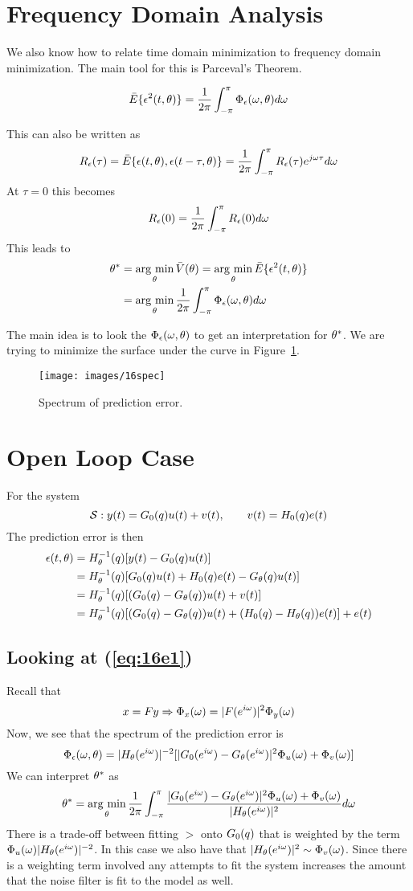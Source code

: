 \section{Frequency Domain Analysis}
We also know how to relate time domain minimization to frequency domain minimization.
The main tool for this is Parceval's Theorem.
\begin{theorem}
$$\bar{E}\{\epsilon^2(t,\theta)\} = \frac{1}{2\pi}\int_{-\pi}^\pi \Phi_\epsilon(\omega,\theta)d\omega$$
\end{theorem}
This can also be written as
$$R_\epsilon(\tau) = \bar{E}\{\epsilon(t,\theta),\epsilon(t-\tau,\theta)\} = \frac{1}{2\pi}\int_{-\pi}^\pi R_\epsilon(\tau)e^{j\omega\tau}d\omega$$
At $\tau=0$ this becomes
$$R_\epsilon(0) = \frac{1}{2\pi}\int_{-\pi}^\pi R_\epsilon(0)d\omega$$
This leads to
\begin{align*}
\theta^\ast &= \mathop{\arg\,\min}\limits_\theta\bar{V}(\theta) = \mathop{\arg\,\min}\limits_\theta\bar{E}\{\epsilon^2(t,\theta)\} \\
&= \mathop{\arg\,\min}\limits_\theta\frac{1}{2\pi}\int_{-\pi}^\pi \Phi_\epsilon(\omega,\theta)d\omega
\end{align*}

The main idea is to look the $\Phi_\epsilon(\omega,\theta)$ to get an interpretation for $\theta^\ast$.
We are trying to minimize the surface under the curve in Figure~\ref{fig:16spec}.

\begin{figure}[ht!]
\centering
\texttt{[image: images/16spec]}
\caption{Spectrum of prediction error.}
\label{fig:16spec}
\end{figure}

\section{Open Loop Case}
For the system
$$\mathcal{S}: y(t) = G_0(q) u(t) + v(t), \qquad v(t) = H_0(q) e(t)$$
The prediction error is then
\begin{align}
\epsilon(t,\theta) &= H_\theta^{-1} (q)[y(t)-G_0(q) u(t)] \nonumber \\
&= H_\theta^{-1} (q)[G_0(q) u(t)+H_0(q) e(t)-G_\theta(q) u(t)] \nonumber \\
\label{eq:16e1}
&= H_\theta^{-1} (q)[(G_0(q)-G_\theta(q))u(t)+v(t)] \\
\label{eq:16e2}
&= H_\theta^{-1} (q) [ (G_0(q) - G_\theta(q)) u(t) + (H_0(q) - H_\theta(q)) e(t) ] + e(t)
\end{align}

\subsection{Looking at (\ref{eq:16e1})}
Recall that
$$x=Fy \Rightarrow \Phi_x(\omega)=|F(e^{i\omega})|^2\Phi_y(\omega)$$
Now, we see that the spectrum of the prediction error is
$$\Phi_\epsilon(\omega,\theta) = |H_\theta(e^{i\omega})|^{-2}[|G_0(e^{i\omega})-G_\theta(e^{i\omega})|^2\Phi_u(\omega) + \Phi_v(\omega)]$$
We can interpret $\theta^\ast$ as
$$\theta^\ast = \mathop{\arg\,\min}\limits_\theta \frac{1}{2\pi} \int_{-\pi}^\pi \frac{|G_0(e^{i\omega})-G_\theta(e^{i\omega})|^2\Phi_u(\omega)+\Phi_v(\omega)}{|H_\theta(e^{i\omega})|^2}d\omega$$
There is a trade-off between fitting $\gt$ onto $G_0(q)$ that is weighted by the term $\Phi_u(\omega)|H_\theta(e^{i\omega})|^{-2}$.
In this case we also have that $|H_\theta(e^{i\omega})|^2\sim\Phi_v(\omega)$.
Since there is a weighting term involved any attempts to fit the system increases the amount that the noise filter is fit to the model as well.

